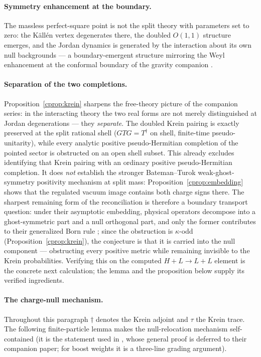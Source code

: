 \documentclass[11pt]{article}
\theoremstyle{definition}
\theoremstyle{remark}
\newcommand{\dg}{\dagger}
\begin{document}
\paragraph{Symmetry enhancement at the boundary.}
The massless perfect-square point is not the split theory with
parameters set to zero: the K\"all\'en vertex degenerates there, the
doubled $O(1,1)$ structure emerges, and the Jordan dynamics is
generated by the interaction about its own null backgrounds --- a
boundary-emergent structure mirroring the Weyl enhancement at the
conformal boundary of the gravity companion \cite{paperIV}.

\paragraph{Separation of the two completions.}
Proposition~\ref{cprop:krein} sharpens the free-theory picture of the
companion series: in the interacting theory the two real forms are not
merely distinguished at Jordan degenerations --- they \emph{separate}.
The doubled Krein pairing is exactly preserved at the split rational
shell ($GTG=T^{\dg}$ on shell, finite-time pseudo-unitarity), while
every analytic positive pseudo-Hermitian completion of the pointed
sector is obstructed on an open shell subset.  This already excludes
identifying that Krein pairing with an ordinary positive
pseudo-Hermitian completion.  It does \emph{not} establish the stronger
Bateman--Turok weak-ghost-symmetry positivity mechanism at split mass:
Proposition~\ref{cprop:embedding} shows that the regulated vacuum image
contains both charge signs there.  The sharpest remaining form of the
reconciliation is therefore a boundary transport question: under their
asymptotic embedding, physical operators decompose into a
ghost-symmetric part and a null orthogonal
part, and only the former contributes to their generalized Born rule
\cite{BT2026}; since the obstruction is $\kappa$-odd
(Proposition~\ref{cprop:krein}), the conjecture is that it is carried
into the null component --- obstructing every positive metric while
remaining invisible to the Krein probabilities.  Verifying this on the
computed $H+L\to L+L$ element is the concrete next calculation; the
lemma and the proposition below supply its verified ingredients.

\paragraph{The charge-null mechanism.}
Throughout this paragraph $\dg$ denotes the Krein adjoint and $\tau$
the Krein trace.  The following finite-particle lemma makes the
null-relocation mechanism self-contained (it is the statement used in
\cite{BT2026}, whose general proof is deferred to their companion
paper; for boost weights it is a three-line grading argument).
\end{document}
